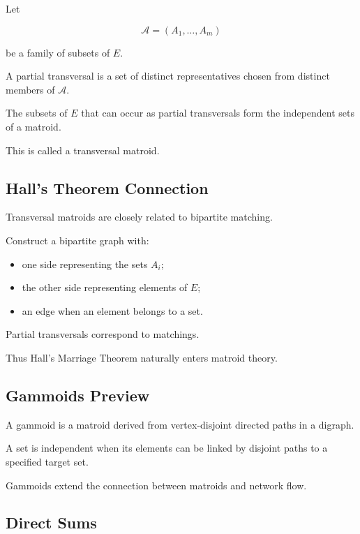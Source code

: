 Let

\[
\mathcal{A}
=
(A_1,\ldots,A_m)
\]

be a family of subsets of \(E\).

A partial transversal is a set of distinct representatives chosen from
distinct members of \(\mathcal{A}\).

The subsets of \(E\) that can occur as partial transversals form the
independent sets of a matroid.

This is called a transversal matroid.

\subsection{Hall's Theorem Connection}
\label{subsec:transversal-hall}

Transversal matroids are closely related to bipartite matching.

Construct a bipartite graph with:

\begin{itemize}
    \item one side representing the sets \(A_i\);
    \item the other side representing elements of \(E\);
    \item an edge when an element belongs to a set.
\end{itemize}

Partial transversals correspond to matchings.

Thus Hall's Marriage Theorem naturally enters matroid theory.

\subsection{Gammoids Preview}
\label{subsec:gammoids-preview}

A gammoid is a matroid derived from vertex-disjoint directed paths in a
digraph.

A set is independent when its elements can be linked by disjoint paths
to a specified target set.

Gammoids extend the connection between matroids and network flow.

\subsection{Direct Sums}
\label{subsec:matroid-direct-sums}

